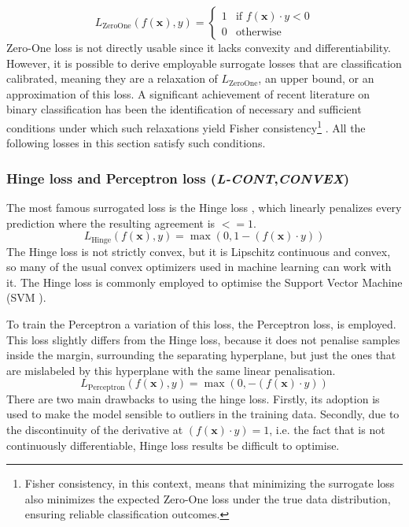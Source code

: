 \documentclass[sn-mathphys-num]{sn-jnl}%
\newcommand \lcont{\textit{L-CONT}}
\newcommand \conv{\textit{CONVEX}}
\renewcommand\vec{\mathbf}
\begin{document}
\begin{equation}
    L_{\text{ZeroOne}}(f(\vec{x}), y) = \begin{cases}
1 &\text{if $f(\vec{x}) \cdot y <0$}\\
0 &\text{otherwise}
\end{cases}
\end{equation}
Zero-One loss is not directly usable since it lacks convexity and differentiability. However, it is possible to derive employable surrogate losses that are classification calibrated, meaning they are a relaxation of $L_{\text{ZeroOne}}$, an upper bound, or an approximation of this loss. A significant achievement of recent literature on binary classification has been the identification of necessary and sufficient conditions under which such relaxations yield Fisher consistency\footnote{Fisher consistency, in this context, means that minimizing the surrogate loss also minimizes the expected Zero-One loss under the true data distribution, ensuring reliable classification outcomes.} \cite{Bartlett2006ConvexityCA,f4a7c73671ce457daaae7ceb2c0e1976,Lugosi2003OnTB,Mannor2003GreedyAF,1377497,Zhang01statisticalbehavior}.
All the following losses in this section satisfy such conditions.
\subsubsection{Hinge loss and Perceptron loss (\lcont,\conv)}\label{subsubsec-classification_perceptron_loss}
The most famous surrogated loss is the Hinge loss \cite{NIPS1998_a14ac55a}, which linearly penalizes every prediction where the resulting agreement is $<=1$. 
\begin{equation}\label{eq:hinge}
    L_{\text{Hinge}}(f(\vec{x}), y) = \max(0,1 - (f(\vec{x}) \cdot y))
\end{equation}
The Hinge loss is not strictly convex, but it is Lipschitz continuous and convex, so many of the usual convex optimizers used in machine learning can work with it.
The Hinge loss is commonly employed to optimise the Support Vector Machine (SVM \cite{bosertraining,mathur2008multiclass}).

To train the Perceptron \cite{rosenblatt1958perceptron} a variation of this loss, the Perceptron loss, is employed. This loss slightly differs from the Hinge loss, because it does not penalise samples inside the margin, surrounding the separating hyperplane, but just the ones that are mislabeled by this hyperplane with the same linear penalisation.
\begin{equation}
    L_{\text{Perceptron}}(f(\vec{x}), y) = \max(0, − (f(\vec{x}) \cdot y))
\end{equation}
There are two main drawbacks to using the hinge loss. Firstly, its adoption is used to make the model sensible to outliers in the training data. Secondly, due to the discontinuity of the derivative at  $(f(\vec{x}) \cdot y) = 1$, i.e. the fact that is not continuously differentiable, Hinge loss results be difficult to optimise.
\end{document}
